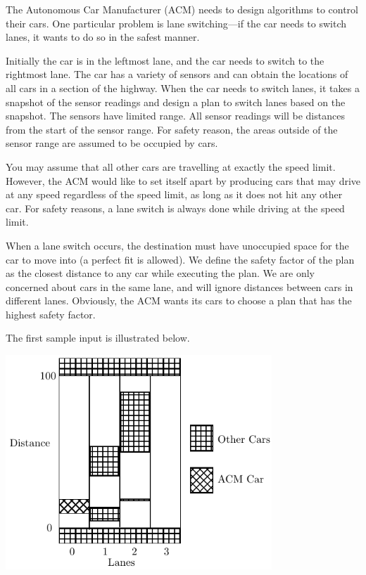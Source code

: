 
The Autonomous Car Manufacturer (ACM) needs to design algorithms to
control their cars.  One particular problem is lane switching---if the
car needs to switch lanes, it wants to do so in the safest manner.

Initially the car is in the leftmost lane, and the car needs to switch
to the rightmost lane.  The car has a variety of sensors and can
obtain the locations of all cars in a section of the highway.  When
the car needs to switch lanes, it takes a snapshot of the sensor
readings and design a plan to switch lanes based on the snapshot.  The
sensors have limited range.  All sensor readings will be distances
from the start of the sensor range.  For safety reason, the areas
outside of the sensor range are assumed to be occupied by cars.


You may assume that all other cars are travelling at exactly the speed
limit.  However, the ACM would like to set itself apart by producing
cars that may drive at any speed regardless of the speed limit, as
long as it does not hit any other car.  For safety reasons, a lane
switch is always done while driving at the speed limit.

When a lane switch occurs, the destination must have unoccupied space
for the car to move into (a perfect fit is allowed).  
We define the safety factor of the plan as the closest distance to any
car while executing the plan.
We are only concerned about cars in the same lane, and will ignore
distances between cars in different lanes.  Obviously, the ACM
wants its cars to choose a plan that has the highest safety factor.

The first sample input is illustrated below.
\begin{center}
    \includegraphics[width=0.75\textwidth]{figure.pdf}
\end{center}
